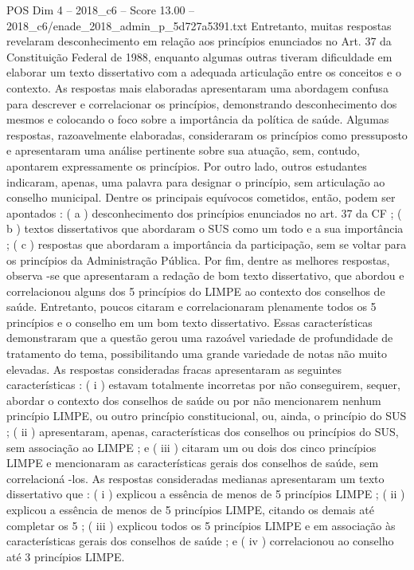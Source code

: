 \begin{textsample}{POS Dim 4 – 2018\_c6 – Score 13.00 – 2018\_c6/enade\_2018\_admin\_p\_5d727a5391.txt}
Entretanto, muitas respostas revelaram desconhecimento em relação aos princípios enunciados no Art. 37 da Constituição Federal de 1988, enquanto algumas outras tiveram dificuldade em elaborar um texto dissertativo com a adequada articulação entre os conceitos e o contexto.
As respostas mais elaboradas apresentaram uma abordagem confusa para descrever e correlacionar os princípios, demonstrando desconhecimento dos mesmos e colocando o foco sobre a importância da política de saúde.
Algumas respostas, razoavelmente elaboradas, consideraram os princípios como pressuposto e apresentaram uma análise pertinente sobre sua atuação, sem, contudo, apontarem expressamente os princípios.
Por outro lado, outros estudantes indicaram, apenas, uma palavra para designar o princípio, sem articulação ao conselho municipal.
Dentre os principais equívocos cometidos, então, podem ser apontados : ( a ) desconhecimento dos princípios enunciados no art. 37 da CF ; ( b ) textos dissertativos que abordaram o SUS como um todo e a sua importância ; ( c ) respostas que abordaram a importância da participação, sem se voltar para os princípios da Administração Pública.
Por fim, dentre as melhores respostas, observa -se que apresentaram a redação de bom texto dissertativo, que abordou e correlacionou alguns dos 5 princípios do LIMPE ao contexto dos conselhos de saúde.
Entretanto, poucos citaram e correlacionaram plenamente todos os 5 princípios e o conselho em um bom texto dissertativo.
Essas características demonstraram que a questão gerou uma razoável variedade de profundidade de tratamento do tema, possibilitando uma grande variedade de notas não muito elevadas.
As respostas consideradas fracas apresentaram as seguintes características : ( i ) estavam totalmente incorretas por não conseguirem, sequer, abordar o contexto dos conselhos de saúde ou por não mencionarem nenhum princípio LIMPE, ou outro princípio constitucional, ou, ainda, o princípio do SUS ; ( ii ) apresentaram, apenas, características dos conselhos ou princípios do SUS, sem associação ao LIMPE ; e ( iii ) citaram um ou dois dos cinco princípios LIMPE e mencionaram as características gerais dos conselhos de saúde, sem correlacioná -los.
As respostas consideradas medianas apresentaram um texto dissertativo que : ( i ) explicou a essência de menos de 5 princípios LIMPE ; ( ii ) explicou a essência de menos de 5 princípios LIMPE, citando os demais até completar os 5 ; ( iii ) explicou todos os 5 princípios LIMPE e em associação às características gerais dos conselhos de saúde ; e ( iv ) correlacionou ao conselho até 3 princípios LIMPE.

\end{textsample}

